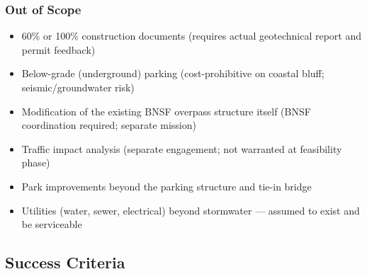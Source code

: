 \documentclass[11pt,letterpaper]{article}
\begin{document}
\subsubsection{Out of Scope}

\begin{itemize}
  \item 60\% or 100\% construction documents (requires actual geotechnical report and permit feedback)
  \item Below-grade (underground) parking (cost-prohibitive on coastal bluff; seismic/groundwater risk)
  \item Modification of the existing BNSF overpass structure itself (BNSF coordination required; separate mission)
  \item Traffic impact analysis (separate engagement; not warranted at feasibility phase)
  \item Park improvements beyond the parking structure and tie-in bridge
  \item Utilities (water, sewer, electrical) beyond stormwater --- assumed to exist and be serviceable
\end{itemize}

\subsection{Success Criteria}
\end{document}
